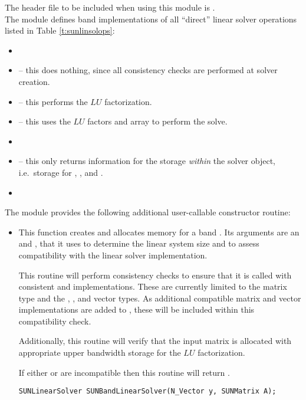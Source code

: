 \noindent The header file to be included when using this module 
is . \\
The {\sunlinsolband} module defines band implementations of all
``direct'' linear solver operations listed in
Table \ref{t:sunlinsolops}:
\begin{itemize}
\item {}
\item {} -- this does nothing, since all
  consistency checks are performed at solver creation.
\item {} -- this performs the $LU$ factorization.
\item {} -- this uses the $LU$ factors
  and  array to perform the solve.
\item {}
\item {} -- this only returns information for
  the storage \emph{within} the solver object, i.e.~storage
  for , , and .
\item {}
\end{itemize}
The module {\sunlinsolband} provides the following additional
user-callable constructor routine: 
\begin{itemize}


\item {}

  This function creates and allocates memory for a band .
  Its arguments are an {\nvector} and {\sunmatrix}, that it uses to
  determine the linear system size and to assess compatibility with
  the linear solver implementation.

  This routine will perform consistency checks to ensure that it is
  called with consistent {\nvector} and {\sunmatrix} implementations.
  These are currently limited to the {\sunmatband} matrix type and
  the {\nvecs}, {\nvecopenmp}, and {\nvecpthreads} vector types.  As
  additional compatible matrix and vector implementations are added to
  {\sundials}, these will be included within this compatibility check.

  Additionally, this routine will verify that the input matrix 
  is allocated with appropriate upper bandwidth storage for the $LU$
  factorization.

  If either  or  are incompatible then this routine will
  return .

  \verb|SUNLinearSolver SUNBandLinearSolver(N_Vector y, SUNMatrix A);|

\end{itemize}
